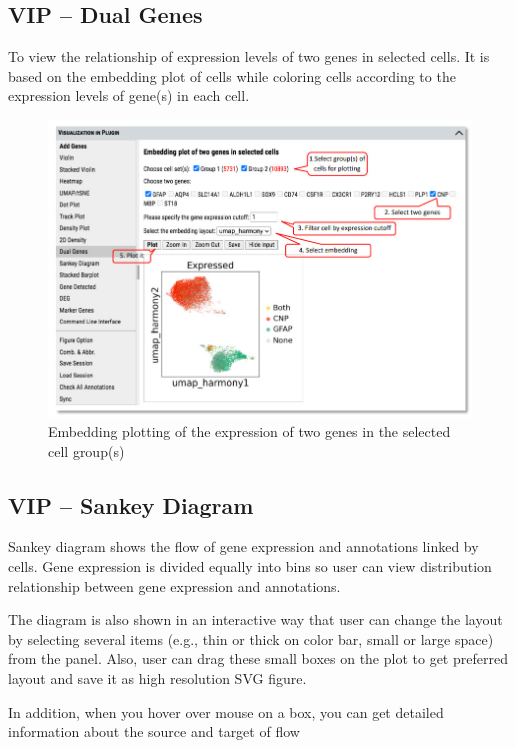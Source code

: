 \documentclass[
]{article}
\begin{document}
\hypertarget{vip-dual-genes}{%
\subsection{VIP -- Dual Genes}\label{vip-dual-genes}}

To view the relationship of expression levels of two genes in selected cells. It is based on the embedding plot of cells while coloring cells according to the expression levels of gene(s) in each cell.

\begin{figure}
\centering
\includegraphics{figures/F15.jpg}
\caption{Embedding plotting of the expression of two genes in the selected cell group(s)}
\end{figure}

\hypertarget{vip-sankey-diagram}{%
\subsection{VIP -- Sankey Diagram}\label{vip-sankey-diagram}}

Sankey diagram shows the flow of gene expression and annotations linked by cells. Gene expression is divided equally into bins so user can view distribution relationship between gene expression and annotations.

The diagram is also shown in an interactive way that user can change the layout by selecting several items (e.g., thin or thick on color bar, small or large space) from the panel. Also, user can drag these small boxes on the plot to get preferred layout and save it as high resolution SVG figure.

In addition, when you hover over mouse on a box, you can get detailed information about the source and target of flow
\end{document}
